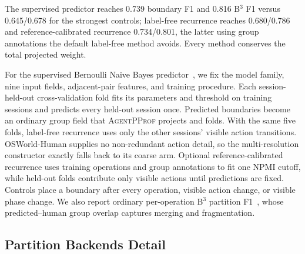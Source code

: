 \documentclass[letterpaper]{article}
\newcommand{\sys}{\textsc{AgentPProf}\xspace}
\begin{document}
The supervised predictor reaches 0.739 boundary F1 and 0.816 B$^3$ F1 versus
0.645/0.678 for the strongest controls; label-free recurrence reaches
0.680/0.786 and reference-calibrated recurrence 0.734/0.801, the latter using
group annotations the default label-free method avoids. Every method conserves
the total projected weight.

For the supervised Bernoulli Naive Bayes predictor~\cite{mccallum-nigam-1998},
we fix the model family, nine input fields, adjacent-pair features, and training
procedure. Each session-held-out cross-validation fold fits its parameters and
threshold on training sessions and predicts every held-out session once.
Predicted boundaries become an ordinary group field that \sys projects and
folds. With the same five folds, label-free recurrence uses only the other
sessions' visible action transitions. OSWorld-Human supplies no non-redundant
action detail, so the multi-resolution constructor exactly falls back to its
coarse arm.
Optional reference-calibrated recurrence uses training operations and group
annotations to fit one NPMI cutoff, while held-out folds contribute only visible
actions until predictions are fixed.
Controls place a boundary after every operation, visible action change, or
visible phase change. We also report ordinary per-operation B$^3$ partition
F1~\cite{bagga-baldwin-1998-entity-based}, whose predicted--human group overlap
captures merging and fragmentation.

\subsection{Partition Backends Detail}
\label{app:partition}
\end{document}
